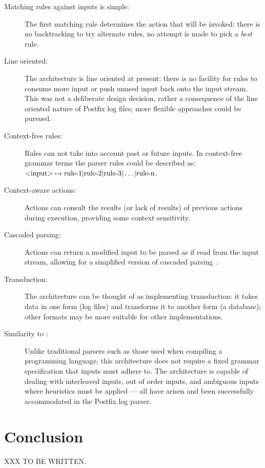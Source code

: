 \label{Architecture characteristics}

\begin{description}

    \item [Matching rules against inputs is simple:]  The first matching
        rule determines the action that will be invoked: there is no
        backtracking to try alternate rules, no attempt is made to pick a
        \textit{best\/} rule.

    \item [Line oriented:]  The architecture is line oriented at present:
        there is no facility for rules to consume more input or push unused
        input back onto the input stream.  This was not a deliberate design
        decision, rather a consequence of the line oriented nature of
        Postfix log files; more flexible approaches could be pursued.

    \item [Context-free rules:]  Rules can not take into account past or
        future inputs.  In context-free grammar terms the parser rules
        could be described as:
        \newline{}$\text{\textless{}input\textgreater{}} \mapsto
        \text{rule-1} | \text{rule-2} | \text{rule-3} | \dots |
        \text{rule-n}$.

    \item [Context-aware actions:] Actions can consult the results (or lack
        of results) of previous actions during execution, providing some
        context sensitivity.  

    \item [Cascaded parsing:] Actions can return a modified input to be
        parsed as if read from the input stream, allowing for a simplified
        version of cascaded parsing~\cite{cascaded-parsing}.

    \item [Transduction:]  The architecture can be thought of as
        implementing transduction: it takes data in one form (log files)
        and transforms it to another form (a database); other formats may
        be more suitable for other implementations.

    \item [Similarity to :] \hfill{} \newline{}
        Unlike traditional parsers such as those used when compiling a
        programming language, this architecture does not require a fixed
        grammar specification that inputs must adhere to.  The architecture
        is capable of dealing with interleaved inputs, out of order inputs,
        and ambiguous inputs where heuristics must be applied --- all have
        arisen and been successfully accommodated in the Postfix log
        parser.

\end{description}


\section{Conclusion}

XXX TO BE WRITTEN\@.
